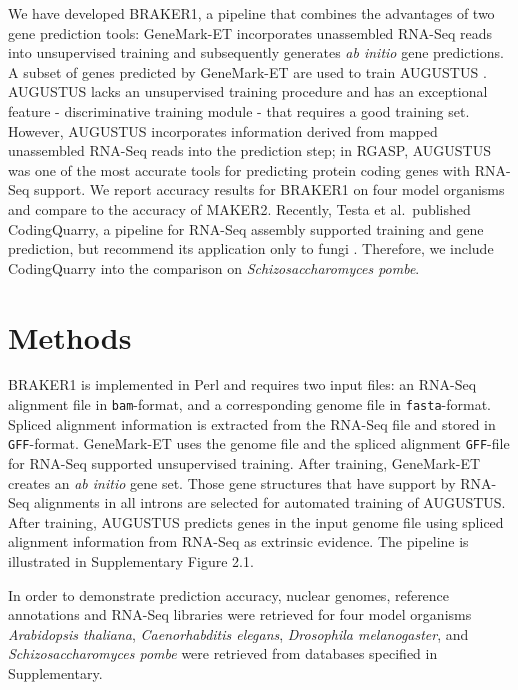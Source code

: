 \documentclass[a4paper,10pt]{article}
\begin{document}
We have developed BRAKER1, a pipeline that combines the advantages of two gene prediction tools: GeneMark-ET \citep{GeneMark-ET} incorporates unassembled RNA-Seq reads into unsupervised training and subsequently generates \textit{ab initio} gene predictions. A subset of genes predicted by GeneMark-ET are used to train AUGUSTUS \citep{AUGUSTUS}. AUGUSTUS lacks an unsupervised training procedure and has an exceptional feature - discriminative training module - that requires a good training set. However, AUGUSTUS incorporates information derived from mapped unassembled RNA-Seq reads into the prediction step; in RGASP, AUGUSTUS was one of the most accurate tools for predicting protein coding genes with RNA-Seq support. We report accuracy results for BRAKER1 on four model organisms and compare to the accuracy of MAKER2. Recently, Testa et al.~published CodingQuarry, a pipeline for RNA-Seq assembly supported training and gene prediction, but recommend its application only to fungi \citep{CodingQuarry}. Therefore, we 
include CodingQuarry into the comparison on \textit{Schizosaccharomyces pombe}.


\section{Methods}

BRAKER1 is implemented in Perl and requires two input files: an RNA-Seq alignment file in \texttt{bam}-format, and a corresponding genome file in \texttt{fasta}-format. Spliced alignment information is extracted from the RNA-Seq file and stored in \texttt{GFF}-format. GeneMark-ET uses the genome file and  the spliced alignment \texttt{GFF}-file for RNA-Seq supported unsupervised training. After training, GeneMark-ET creates an \textit{ab initio} gene set. Those gene structures that have support by RNA-Seq alignments in all introns are selected for automated training of AUGUSTUS. After training, AUGUSTUS predicts genes in the input genome file using spliced alignment information from RNA-Seq as extrinsic evidence. The pipeline is illustrated in Supplementary Figure 2.1.




In order to demonstrate prediction accuracy, nuclear genomes, reference annotations and RNA-Seq libraries were retrieved for four model organisms \textit{Arabidopsis thaliana}, \textit{Caenorhabditis elegans}, \textit{Drosophila melanogaster}, and \textit{Schizosaccharomyces pombe} were retrieved from databases specified in Supplementary.
\end{document}
